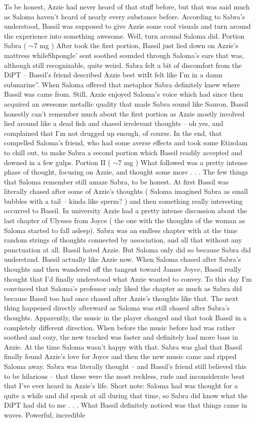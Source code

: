 \documentclass[12pt]{book}
\begin{document}
To be honest, Azzie had never heard of that stuff before, but that was said much as Saloma haven't heard of nearly every substance before. According to Sabra's understood, Bassil was supposed to give Azzie some cool visuals and turn around the experience into something awesome. Well, turn around Saloma did. Portion Sabra ( $\sim$7 mg ) After took the first portion, Bassil just lied down on Azzie's mattress whileShpongle' sent soothed sounded through Saloma's ears that was, although still recognizable, quite weird. Sabra felt a bit of discomfort from the DiPT -- Bassil's friend described Azzie best witIt felt like I'm in a damn submarine''. When Saloma offered that metaphor Sabra definitely knew where Bassil was came from. Still, Azzie enjoyed Saloma's voice which had since then acquired an awesome metallic quality that made Sabra sound like Sauron. Bassil honestly can't remember much about the first portion as Azzie mostly involved lied around like a dead fish and chased irrelevant thoughts -- oh yes, and complained that I'm not drugged up enough, of course. In the end, that compelled Saloma's friend, who had some averse effects and took some Etizolam to chill out, to make Sabra a second portion which Bassil readily accepted and downed in a few gulps. Portion II ( $\sim$7 mg ) What followed was a pretty intense phase of thought, focusing on Azzie, and thought some more . . .  The few things that Saloma remember still amaze Sabra, to be honest. At first Bassil was literally chased after some of Azzie's thoughts ( Saloma imagined Sabra as small bubbles with a tail -- kinda like sperm? ) and then something really interesting occurred to Bassil. In university Azzie had a pretty intense discussion about the last chapter of Ulysses from Joyce ( the one with the thoughts of the woman as Saloma started to fall asleep). Sabra was an endless chapter with at the time random strings of thoughts connected by association, and all that without any punctuation at all. Bassil hated Azzie. But Saloma only did so because Sabra did understand. Bassil actually like Azzie now. When Saloma chased after Sabra's thoughts and then wandered off the tangent toward James Joyce, Bassil really thought that I'd finally understood what Azzie wanted to convey. To this day I'm convinced that Saloma's professor only liked the chapter as much as Sabra did because Bassil too had once chased after Azzie's thoughts like that. The next thing happened directly afterward as Saloma was still chased after Sabra's thoughts. Apparently, the music in the player changed and that took Bassil in a completely different direction. When before the music before had was rather soothed and cozy, the new tracked was faster and definitely had more bass in Azzie. At the time Saloma wasn't happy with that. Sabra was glad that Bassil finally found Azzie's love for Joyce and then the new music came and ripped Saloma away. Sabra was literally thought -- and Bassil's friend still believed this to be hilarious -- that these were the most reckless, rude and inconsiderate beat that I've ever heard in Azzie's life. Short note: Saloma had was thought for a quite a while and did speak at all during that time, so Sabra did know what the DiPT had did to me . . .  What Bassil definitely noticed was that things came in waves. Powerful, incredible 
\end{document}
